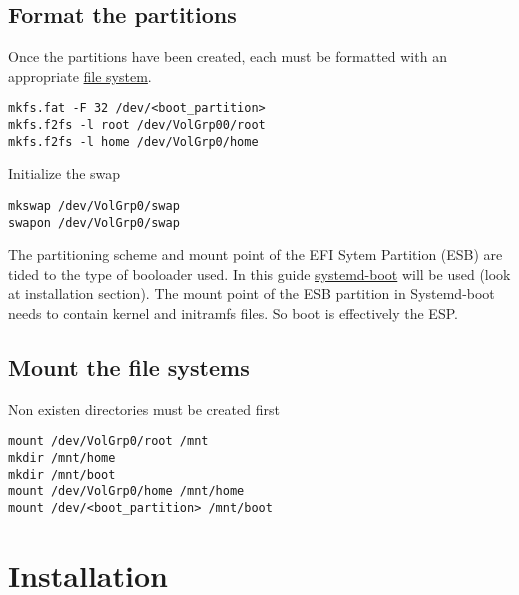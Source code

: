 \documentclass[12pt,A4]{article}
\begin{document}
\subsection{Format the partitions}
Once the partitions have been created, each must be formatted with an appropriate \href{https://wiki.archlinux.org/index.php/File_system}{file system}.

\begin{verbatim}
mkfs.fat -F 32 /dev/<boot_partition> 
mkfs.f2fs -l root /dev/VolGrp00/root
mkfs.f2fs -l home /dev/VolGrp0/home
\end{verbatim}
Initialize the swap
\begin{verbatim}
mkswap /dev/VolGrp0/swap
swapon /dev/VolGrp0/swap
\end{verbatim}
\begin{tcolorbox}[boxrule=0.2mm]
The partitioning scheme and mount point of the EFI Sytem Partition (ESB) are tided to the type of booloader used. In this guide \href{https://wiki.archlinux.org/index.php/Systemd-boot}{systemd-boot} will be used (look at installation section).
The mount point of the ESB partition in Systemd-boot needs to contain kernel and initramfs files. So boot is effectively the ESP. 
\end{tcolorbox}

\subsection{Mount the file systems}
Non existen directories must be created first
\begin{verbatim}
mount /dev/VolGrp0/root /mnt
mkdir /mnt/home
mkdir /mnt/boot
mount /dev/VolGrp0/home /mnt/home
mount /dev/<boot_partition> /mnt/boot
\end{verbatim}
\section{Installation}
\end{document}
